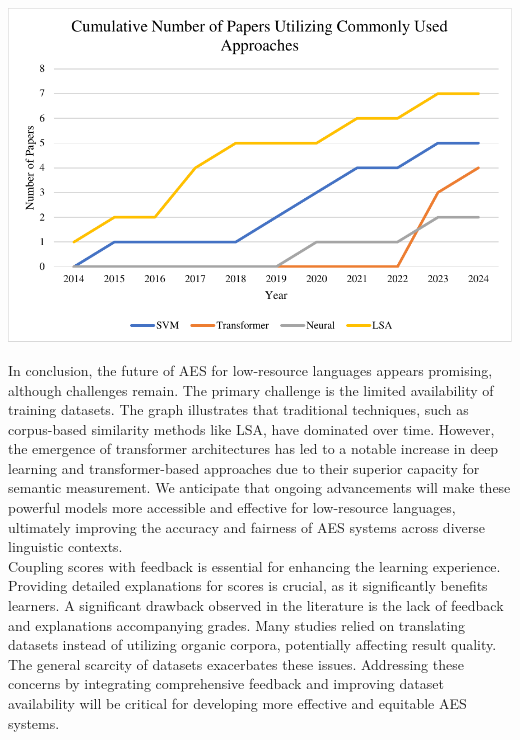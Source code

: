 \documentclass{article}
\begin{document}
	\includegraphics{img/paperstrend.pdf}
	
	In conclusion, the future of AES for low-resource languages appears promising, although challenges remain. The primary challenge is the limited availability of training datasets. The graph illustrates that traditional techniques, such as corpus-based similarity methods like LSA, have dominated over time. However, the emergence of transformer architectures has led to a notable increase in deep learning and transformer-based approaches due to their superior capacity for semantic measurement. We anticipate that ongoing advancements will make these powerful models more accessible and effective for low-resource languages, ultimately improving the accuracy and fairness of AES systems across diverse linguistic contexts. \\
	
	Coupling scores with feedback is essential for enhancing the learning experience. Providing detailed explanations for scores is crucial, as it significantly benefits learners. A significant drawback observed in the literature is the lack of feedback and explanations accompanying grades. Many studies relied on translating datasets instead of utilizing organic corpora, potentially affecting result quality. The general scarcity of datasets exacerbates these issues. Addressing these concerns by integrating comprehensive feedback and improving dataset availability will be critical for developing more effective and equitable AES systems.
	
	
	\printbibliography
\end{document}
